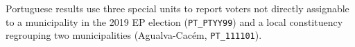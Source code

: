Portuguese results use three special units to report voters not directly
assignable to a municipality in the 2019 EP election (\texttt{PT\_PTYY99}) and
a local constituency regrouping two municipalities (Agualva-Cacém, \texttt{PT\_111101}).